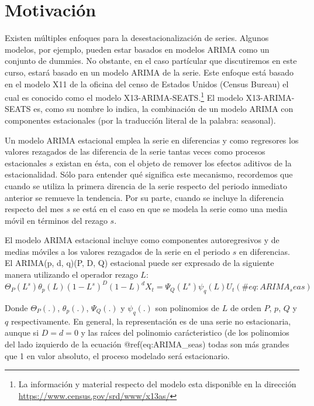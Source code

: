 \documentclass[
]{book}
\begin{document}
\hypertarget{motivaciuxf3n}{%
\section{Motivación}\label{motivaciuxf3n}}

Existen múltiples enfoques para la desestacionalización de series. Algunos modelos, por ejemplo, pueden estar basados en modelos ARIMA como un conjunto de dummies. No obstante, en el caso partícular que discutiremos en este curso, estará basado en un modelo ARIMA de la serie. Este enfoque está basado en el modelo X11 de la oficina del censo de Estados Unidos (Census Bureau) el cual es conocido como el modelo X13-ARIMA-SEATS.\footnote{ La información y material respecto del modelo esta disponible en la dirección \url{https://www.census.gov/srd/www/x13as/}} El modelo X13-ARIMA-SEATS es, como su nombre lo indica, la combinación de un modelo ARIMA con componentes estacionales (por la traducción literal de la palabra: seasonal).

Un modelo ARIMA estacional emplea la serie en diferencias y como regresores los valores rezagados de las diferencia de la serie tantas veces como procesos estacionales \(s\) existan en ésta, con el objeto de remover los efectos aditivos de la estacionalidad. Sólo para entender qué significa este mecanismo, recordemos que cuando se utiliza la primera direncia de la serie respecto del periodo inmediato anterior se remueve la tendencia. Por su parte, cuando se incluye la diferencia respecto del mes \(s\) se está en el caso en que se modela la serie como una media móvil en términos del rezago \(s\).

El modelo ARIMA estacional incluye como componentes autoregresivos y de medias móviles a los valores rezagados de la serie en el periodo \(s\) en diferencias. El ARIMA(p, d, q)(P, D, Q) estacional puede ser expresado de la siguiente manera utilizando el operador rezago \(L\):
\begin{equation}
    \Theta_P(L^s) \theta_p(L) (1 - L^s)^D (1 - L)^d X_t = \Psi_Q(L^s) \psi_q(L) U_t
    (\#eq:ARIMA_seas)
\end{equation}

Donde \(\Theta_P(.)\), \(\theta_p(.)\), \(\Psi_Q(.)\) y \(\psi_q(.)\) son polinomios de \(L\) de orden \(P\), \(p\), \(Q\) y \(q\) respectivamente. En general, la representación es de una serie no estacionaria, aunque si \(D = d = 0\) y las raíces del polinomio carácteristico (de los polinomios del lado izquierdo de la ecuación @ref(eq:ARIMA\_seas) todas son más grandes que 1 en valor absoluto, el proceso modelado será estacionario.
\end{document}
